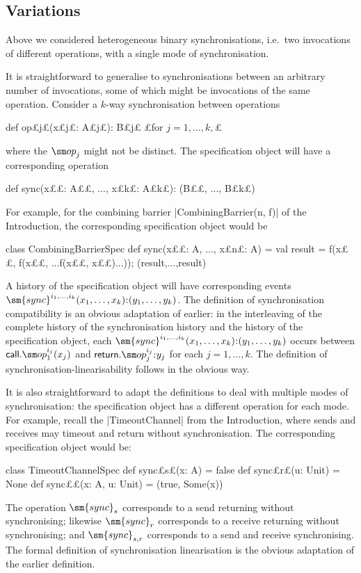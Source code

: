 
\subsection{Variations}
\label{ssec:spec-variations}

Above we considered heterogeneous binary synchronisations, i.e.~two
invocations of different operations, with a single mode of synchronisation.

It is straightforward to generalise to synchronisations between an arbitrary
number of invocations, some of which might be invocations of the same
operation.  Consider a $k$-way synchronisation between operations
\begin{scala}
  def op£\s j£(x£\s j£: A£\s j£): B£\s j£   £for $j = 1, \ldots, k,$£
\end{scala}
%
where the $\op_j$ might not be distinct.
The specification object will have a corresponding operation
%
\begin{scala} 
  def sync(x££: A££, ..., x£\s k£: A£\s k£): (B££, ..., B£\s k£)
\end{scala}
%
For example, for the combining barrier |CombiningBarrier(n, f)| of the
Introduction, the corresponding specification object would be
\begin{scala}
class CombiningBarrierSpec{
  def sync(x££: A, ..., x£\s n£: A) = {
    val result = f(x££, f(x££, ...f(x££, x££)...)); (result,...,result)
  }
}
\end{scala}

A history of the specification object will have corresponding events
$\sm{sync}^{i_1, \ldots, i_k}(x_1, \ldots, x_k)\:: (y_1, \ldots, y_k)$.
%
The definition of synchronisation compatibility is an obvious adaptation of
earlier: in the interleaving of the complete history of the synchronisation
history and the history of the specification object, each $\sm{sync}^{i_1,
  \ldots, i_k}(x_1, \ldots, x_k)\:: (y_1, \ldots, y_k)$ occurs between
$\call.\op_1^{i_j}(x_j)$ and $\return.\op_j^{i_j}\::y_j$ for each $j = 1, \ldots,
k$.  The definition of synchronisation-linearisability follows in the obvious
way. 

It is also straightforward to adapt the definitions to deal with multiple
modes of synchronisation: the specification object has a different operation
for each mode.  For example, recall the |TimeoutChannel| from the
Introduction, where sends and receives may timeout and return without
synchronisation.  The corresponding specification object would be:
%
\begin{scala}
class TimeoutChannelSpec{
  def sync£\s s£(x: A) = false
  def sync£\s r£(u: Unit) = None
  def sync££(x: A, u: Unit) = (true, Some(x))
}
\end{scala}
%
The operation $\sm{sync}_s$ corresponds to a send returning without
synchronising; likewise $\sm{sync}_r$ corresponds to a receive returning
without synchronising; and $\sm{sync}_{s,r}$ corresponds to a send and receive
synchronising.  The formal definition of synchronisation linearisation is the
obvious adaptation of the earlier definition.


